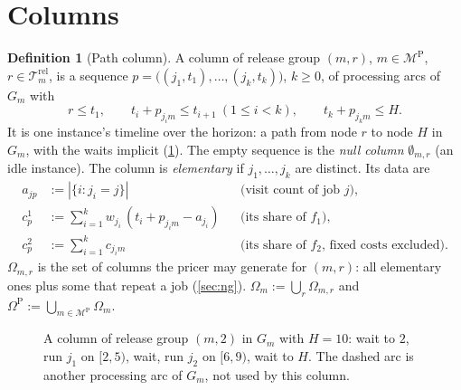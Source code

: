 \documentclass[11pt,a4paper]{article}
\theoremstyle{definition}
\newtheorem{definition}[theorem]{Definition}
\theoremstyle{remark}
\newcommand{\M}{\mathcal{M}}
\newcommand{\MP}{\M^{\mathrm{P}}}
\newcommand{\Rel}{\mathcal{T}^{\mathrm{rel}}}
\newcommand{\Om}{\Omega}
\begin{document}
\section{Columns}\label{sec:columns}

\begin{definition}[Path column]\label{def:column}
A column of release group $(m,r)$, $m\in\MP$, $r\in\Rel_m$, is a sequence
$p=\bigl((j_1,t_1),\dots,(j_k,t_k)\bigr)$, $k\ge0$, of processing arcs of $G_m$
with
\[
r\le t_1,\qquad t_i+p_{j_im}\le t_{i+1}\ (1\le i<k),\qquad t_k+p_{j_km}\le H .
\]
It is one instance's timeline over the horizon: a path from node $r$ to node $H$
in $G_m$, with the waits implicit (\cref{fig:network}). The empty sequence is
the \emph{null column} $\emptyset_{m,r}$ (an idle instance). The column is
\emph{elementary} if $j_1,\dots,j_k$ are distinct. Its data are
\begin{align*}
a_{jp}&:=|\{i: j_i=j\}| &&\text{(visit count of job $j$)},\\
c^1_p&:=\textstyle\sum_{i=1}^k w_{j_i}\,(t_i+p_{j_im}-a_{j_i}) &&\text{(its share of $f_1$)},\\
c^2_p&:=\textstyle\sum_{i=1}^k c_{j_im} &&\text{(its share of $f_2$, fixed costs excluded)}.
\end{align*}
$\Om_{m,r}$ is the set of columns the pricer may generate for $(m,r)$: all
elementary ones plus some that repeat a job (\cref{sec:ng}).
$\Om_m:=\bigcup_r\Om_{m,r}$ and $\Om^{\mathrm P}:=\bigcup_{m\in\MP}\Om_m$.
\end{definition}

\begin{figure}[ht]
\centering
{}
\caption{A column of release group $(m,2)$ in $G_m$ with $H=10$: wait to $2$,
run $j_1$ on $[2,5)$, wait, run $j_2$ on $[6,9)$, wait to $H$. The dashed arc
is another processing arc of $G_m$, not used by this column.}
\label{fig:network}
\end{figure}
\end{document}

